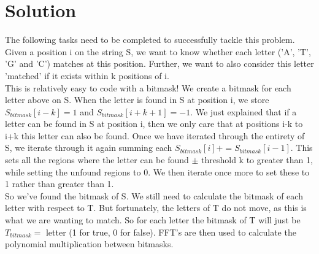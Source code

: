 \documentclass{article}
\begin{document}
\section{Solution}
The following tasks need to be completed to successfully tackle this problem.
Given a position i on the string S, we want to know whether each letter ('A', 'T', 'G' and 'C') matches at this position. Further, we want to also consider this letter 'matched' if it exists within k positions of i. \\
This is relatively easy to code with a bitmask! We create a bitmask for each letter above on S. When the letter is found in S at position i, we store $S_{bitmask}[i-k] = 1$ and $S_{bitmask}[i+k+1] = -1$. We just explained that if a letter can be found in S at position i, then we only care that at positions i-k to i+k this letter can also be found. Once we have iterated through the entirety of S, we iterate through it again summing each $S_{bitmask}[i] += S_{bitmask}[i-1]$. This sets all the regions where the letter can be found $\pm$ threshold k to greater than 1, while setting the unfound regions to 0. We then iterate once more to set these to 1 rather than greater than 1. \\
So we've found the bitmask of S. We still need to calculate the bitmask of each letter with respect to T. But fortunately, the letters of T do not move, as this is what we are wanting to match. So for each letter the bitmask of T will just be $T_{bitmask} = $ letter (1 for true, 0 for false). FFT's are then used to calculate the polynomial multiplication between bitmasks. 
\end{document}
